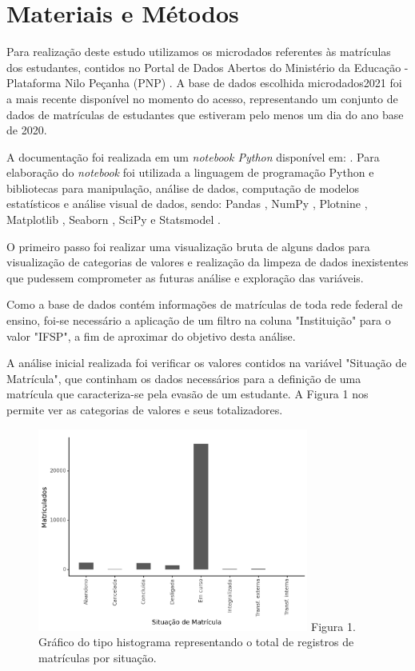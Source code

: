 \documentclass[conference]{IEEEtran}
\begin{document}
\section{Materiais e Métodos}
Para realização deste estudo utilizamos os microdados referentes às matrículas dos estudantes, contidos no Portal de Dados Abertos do Ministério da Educação - Plataforma Nilo Peçanha (PNP) \cite{pnpdados2024}. A base de dados escolhida {microdados2021} foi a mais recente disponível no momento do acesso, representando um conjunto de dados de matrículas de estudantes que estiveram pelo menos um dia do ano base de 2020.\par
A documentação foi realizada em um \textit{notebook Python} disponível em: . Para elaboração do \textit{notebook} foi utilizada a linguagem de programação Python \cite{python2024} e bibliotecas para manipulação, análise de dados, computação de modelos estatísticos e análise visual de dados, sendo: Pandas \cite{pandas2024}, NumPy \cite{numpy2024}, Plotnine \cite{plotnine20204}, Matplotlib \cite{matplot2024}, Seaborn \cite{seaborn2024}, SciPy \cite{scipy2024} e Statsmodel \cite{statsmodel2024}.\par
O primeiro passo foi realizar uma visualização bruta de alguns dados para visualização de categorias de valores e realização da limpeza de dados inexistentes que pudessem comprometer as futuras análise e exploração das variáveis.\par
Como a base de dados contém informações de matrículas de toda rede federal de ensino, foi-se necessário a aplicação de um filtro na coluna "Instituição" para o valor "IFSP", a fim de aproximar do objetivo desta análise.\par
A análise inicial realizada foi verificar os valores contidos na variável "Situação de Matrícula", que continham os dados necessários para a definição de uma matrícula que caracteriza-se pela evasão de um estudante. A Figura 1 nos permite ver as categorias de valores e seus totalizadores.\par

\begin{figure}[h]
    \includegraphics[width=8.9cm]{figs/figura-1.png}
    \centering
    Figura 1. Gráfico do tipo histograma representando o total de registros de matrículas por situação.
\end{figure}
\end{document}
